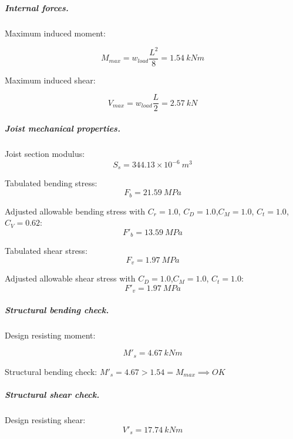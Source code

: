 \subparagraph{Internal forces.}

\noindent Maximum induced moment:

\begin{equation}
  M_{max}= w_{load} \frac{L^2}{8}= 1.54\ kN m
\end{equation}

\noindent Maximum induced shear:

\begin{equation}
  V_{max}= w_{load} \frac{L}{2}= 2.57\ kN
\end{equation}

\subparagraph{Joist mechanical properties.}

\noindent Joist section modulus:
\begin{equation}
  S_s= 344.13 \times 10^{-6}\ m^3
\end{equation}

\noindent Tabulated bending stress:
\begin{equation}
  F_b= 21.59\ MPa
\end{equation}


\noindent Adjusted allowable bending stress with $C_r= 1.0$, $C_D= 1.0$,$C_M= 1.0$, $C_t= 1.0$,$C_V= 0.62$:
\begin{equation}
  F'_b= 13.59\ MPa
\end{equation}

\noindent Tabulated shear stress:
\begin{equation}
  F_v= 1.97\ MPa
\end{equation}

\noindent Adjusted allowable shear stress with $C_D= 1.0$,$C_M= 1.0$, $C_t= 1.0$:
\begin{equation}
  F'_v= 1.97\ MPa
\end{equation}

\subparagraph{Structural bending check.}

\noindent Design resisting moment:

\begin{equation}
  M'_s= 4.67\ kN m
\end{equation}

\noindent Structural bending check: $M'_s = 4.67 > 1.54 = M_{max} \implies OK$

\subparagraph{Structural shear check.}

\noindent Design resisting shear:
\begin{equation}
  V'_s= 17.74\ kN m
\end{equation}

